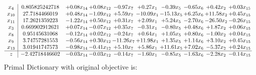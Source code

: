 \documentclass[9pt]{article}
\begin{document}
\[\begin{array}{c| c c@{\hskip 2pt} c@{\hskip 2pt} c@{\hskip 2pt} c@{\hskip 2pt} c@{\hskip 2pt} c@{\hskip 2pt} c@{\hskip 2pt} c@{\hskip 2pt} }
 x_{4}   &  0.805825242718 & +  0.08 x_{14} & +  0.08 x_{12} & -0.97 x_{7} & +  0.27 x_{1} & -0.39 x_{5} & -0.65 x_{6} & +  0.42 x_{2} & +  0.03 x_{15}\\
 x_{10}   &  27.7184466019 & +  0.48 x_{14} & -1.09 x_{12} & +  5.59 x_{7} & -10.09 x_{1} & -15.13 x_{5} & +  6.25 x_{6} & + 11.58 x_{2} & +  0.45 x_{15}\\
 x_{11}   &  17.2621359223 & -1.22 x_{14} & +  0.50 x_{12} & +  0.31 x_{7} & +  2.09 x_{1} & +  5.24 x_{5} & -2.70 x_{6} & -26.50 x_{2} & -0.26 x_{15}\\
 x_{3}   &  0.669902912621 & +  0.07 x_{14} & -0.07 x_{12} & +  0.35 x_{7} & -0.31 x_{1} & -0.80 x_{5} & +  0.48 x_{6} & +  1.87 x_{2} & +  0.06 x_{15}\\
 x_{8}   &  0.95145631068 & -0.12 x_{14} & +  0.02 x_{12} & -0.24 x_{7} & +  0.64 x_{1} & +  1.05 x_{5} & +  0.80 x_{6} & -1.00 x_{2} & +  0.04 x_{15}\\
 x_{9}   &  3.74757281553 & -0.56 x_{14} & +  0.30 x_{12} & -11.26 x_{7} & + 11.98 x_{1} & +  1.35 x_{5} & +  1.14 x_{6} & +  3.10 x_{2} & +  0.45 x_{15}\\
 x_{13}   &  3.01941747573 & -0.98 x_{14} & -0.41 x_{12} & +  5.10 x_{7} & +  5.86 x_{1} & + 11.61 x_{5} & +  7.02 x_{6} & -5.37 x_{2} & +  0.24 x_{15}\\
\hline
z    &  -2.42718446602 & -0.03 x_{14} & -0.03 x_{12} & -0.14 x_{7} & -1.60 x_{1} & -0.85 x_{5} & -1.63 x_{6} & -2.28 x_{2} & -0.14 x_{15}\\
\end{array}\]
Primal Dictionary with original objective is:
\end{document}
